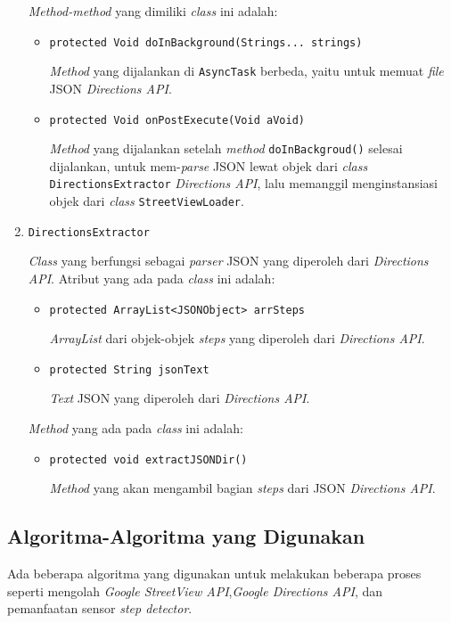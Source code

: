 \begin{enumerate}
	\textit{Method-method} yang dimiliki \textit{class} ini adalah:
	
	\begin{itemize}
		\item \texttt{protected Void doInBackground(Strings... strings)}
		
		\textit{Method} yang dijalankan di \texttt{AsyncTask} berbeda, yaitu untuk memuat \textit{file} JSON \textit{Directions API}.
		\item \texttt{protected Void onPostExecute(Void aVoid)}
		
		\textit{Method} yang dijalankan setelah \textit{method} \texttt{doInBackgroud()} selesai dijalankan, untuk mem-\textit{parse} JSON lewat objek dari \textit{class} \texttt{DirectionsExtractor} \textit{Directions API}, lalu memanggil menginstansiasi objek dari \textit{class} \texttt{StreetViewLoader}. 
	\end{itemize} 
	
	\item \texttt{DirectionsExtractor}
	
	\textit{Class} yang berfungsi sebagai \textit{parser} JSON yang diperoleh dari \textit{Directions API}. Atribut yang ada pada \textit{class} ini adalah:
	
	\begin{itemize}
		\item \texttt{protected ArrayList<JSONObject> arrSteps}
		
		\textit{ArrayList} dari objek-objek \textit{steps} yang diperoleh dari \textit{Directions API}.
		\item \texttt{protected String jsonText}
		
		\textit{Text} JSON yang diperoleh dari \textit{Directions API}. 
	\end{itemize}
	
	\textit{Method} yang ada pada \textit{class} ini adalah:
	
	\begin{itemize}
		\item \texttt{protected void extractJSONDir()} 
		
		\textit{Method} yang akan mengambil bagian \textit{steps} dari JSON \textit{Directions API}.	
	\end{itemize}
\end{enumerate} 

\subsection{Algoritma-Algoritma yang Digunakan}
Ada beberapa algoritma yang digunakan   untuk melakukan beberapa proses seperti mengolah \textit{Google StreetView API},\textit{Google Directions API}, dan pemanfaatan sensor \textit{step detector}.

